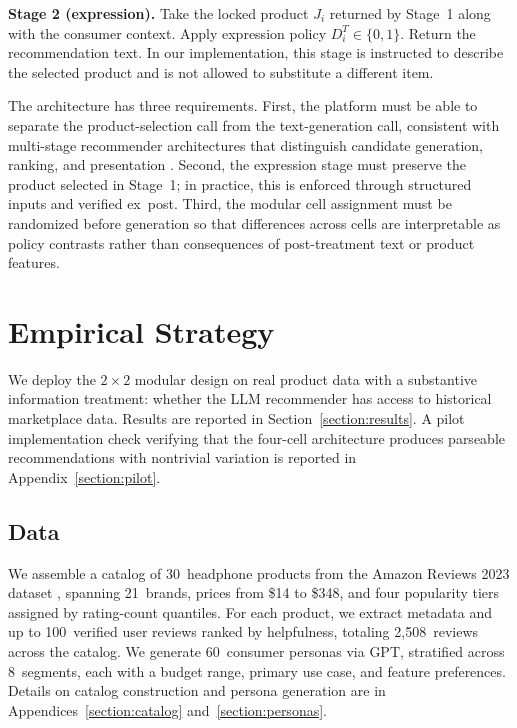 \documentclass[11pt]{article}
\newcommand{\J}{J}
\newcommand{\Rreg}{D^T}
\begin{document}
\textbf{Stage 2 (expression).} Take the locked product $\J_i$ returned by Stage~1 along with the consumer context. Apply expression policy $\Rreg_i \in \{0, 1\}$. Return the recommendation text. In our implementation, this stage is instructed to describe the selected product and is not allowed to substitute a different item.

The architecture has three requirements. First, the platform must be able to separate the product-selection call from the text-generation call, consistent with multi-stage recommender architectures that distinguish candidate generation, ranking, and presentation \citep{ma2020off}. Second, the expression stage must preserve the product selected in Stage~1; in practice, this is enforced through structured inputs and verified ex~post. Third, the modular cell assignment must be randomized before generation so that differences across cells are interpretable as policy contrasts rather than consequences of post-treatment text or product features.

\section{Empirical Strategy}\label{section:empirics}

We deploy the $2 \times 2$ modular design on real product data with a substantive information treatment: whether the LLM recommender has access to historical marketplace data. Results are reported in Section~\ref{section:results}. A pilot implementation check verifying that the four-cell architecture produces parseable recommendations with nontrivial variation is reported in Appendix~\ref{section:pilot}.

\subsection{Data}

We assemble a catalog of 30~headphone products from the Amazon Reviews 2023 dataset \citep{hou2024amazon}, spanning 21~brands, prices from \$14 to \$348, and four popularity tiers assigned by rating-count quantiles. For each product, we extract metadata and up to 100~verified user reviews ranked by helpfulness, totaling 2{,}508~reviews across the catalog. We generate 60~consumer personas via GPT, stratified across 8~segments, each with a budget range, primary use case, and feature preferences. Details on catalog construction and persona generation are in Appendices~\ref{section:catalog} and~\ref{section:personas}.
\end{document}
